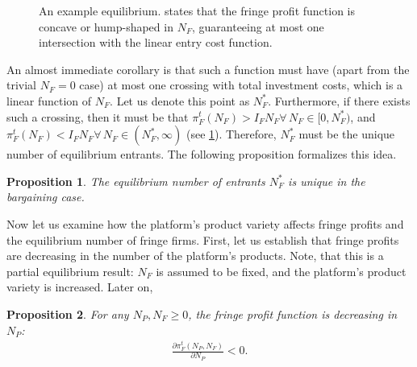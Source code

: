 \documentclass[a4paper]{article}
\newtheorem{proposition}{Proposition}
\begin{document}
\begin{figure}[ht]
    \centering
    \caption{An example equilibrium.  states that the fringe profit function is concave or hump-shaped in $N_F$, guaranteeing at most one intersection with the linear entry cost function.}
    \label{fig:equilibrium}
\end{figure}

An almost immediate corollary is that such a function must have (apart from the trivial $N_F=0$ case) at most one crossing with total investment costs, which is a linear function of $N_F$.
Let us denote this point as $N_F^*$.
Furthermore, if there exists such a crossing, then it must be that $\pi_F^t(N_F) > I_F N_F \forall\, N_F \in [0, N_F^*)$, and $\pi_F^t(N_F) < I_F N_F \forall\, N_F \in (N_F^*, \infty)$ (see \cref{fig:equilibrium}).
Therefore, $N_F^*$ must be the unique number of equilibrium entrants.
The following proposition formalizes this idea.
\begin{proposition}
    \label{prop:unique_equilibrium}
    The equilibrium number of entrants $N_F^*$ is unique in the bargaining case.
\end{proposition}

Now let us examine how the platform's product variety affects fringe profits and the equilibrium number of fringe firms.
First, let us establish that fringe profits are decreasing in the number of the platform's products.
Note, that this is a partial equilibrium result: $N_F$ is assumed to be fixed, and the platform's product variety is increased.
Later on, 
\begin{proposition}
    \label{prop:fringe_profits_partial}
    For any $N_P, N_F \geq 0$, the fringe profit function is decreasing in $N_P$:
    \begin{align*}
        \frac{\partial \pi_F^t(N_P, N_F)}{\partial N_P} < 0.
    \end{align*}
\end{proposition}
\end{document}
